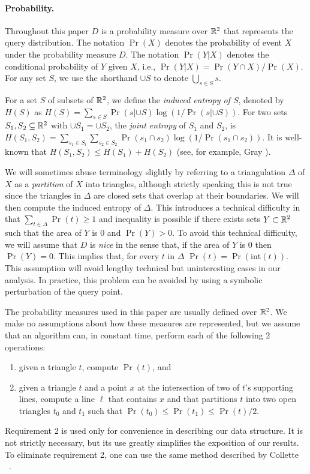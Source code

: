 \documentclass[lotsofwhite]{patmorin}
\newcommand{\interior}{\mathrm{int}}
\begin{document}
\paragraph{Probability.}

Throughout this paper $D$ is a probability measure over $\mathbb{R}^2$ that
represents the query distribution.  The notation $\Pr(X)$ denotes the
probability of event $X$ under the probability measure $D$.  The
notation $\Pr(Y|X)$ denotes the conditional probability of $Y$ given
$X$, i.e., $\Pr(Y|X)=\Pr(Y\cap X)/\Pr(X)$.  For any set $S$, we use
the shorthand $\cup S$ to denote $\bigcup_{s\in S} s$.

For a set $S$ of subsets of $\mathbb{R}^2$, we define the \emph{induced
entropy of $S$}, denoted by $H(S)$ as $H(S)=\sum_{s\in S}\Pr(s|{\cup
S})\log(1/\Pr(s|{\cup S}))$.  For two sets $S_1,S_2\subseteq\mathbb{R}^2$ with
$\cup S_1=\cup S_2$, the \emph{joint entropy} of $S_1$ and $S_2$, is
$H(S_1,S_2) = \sum_{s_1\in S_i}\sum_{s_2\in S_2} \Pr(s_1\cap
s_2)\log(1/\Pr(s_1\cap s_2))$.  It is well-known that $H(S_1,S_2)\le
H(S_1)+H(S_2)$ (see, for example, Gray \cite[Lemma~2.3.2]{g08}).

We will sometimes abuse terminology slightly by referring to a
triangulation $\Delta$ of $X$ as a \emph{partition} of $X$ into
triangles, although strictly speaking this is not true since the
triangles in $\Delta$ are closed sets that overlap at their
boundaries.  We will then compute the induced entropy of $\Delta$.
This introduces a technical difficulty in that
$\sum_{t\in\Delta}\Pr(t)\ge 1$ and inequality is possible if there
exists sets $Y\subset \mathbb{R}^2$ such that the area of $Y$ is 0 and
$\Pr(Y)>0$.  To avoid this technical difficulty, we will assume that
$D$ is \emph{nice} in the sense that, if the area of $Y$ is 0 then
$\Pr(Y)=0$.   This implies that, for every $t$ in $\Delta$ $\Pr(t) =
\Pr(\interior(t))$.  This assumption will avoid lengthy technical but
uninteresting cases in our analysis.  In practice, this problem can
be avoided by using a symbolic perturbation of the query point.

The probability measures used in this paper are usually defined over
$\mathbb{R}^2$.  We make no assumptions about how these measures are
represented, but we assume that an algorithm can, in constant time,
perform each of the following 2 operations:
\begin{enumerate}
\item given a triangle $t$, compute $\Pr(t)$, and
\item given a triangle $t$ and a point $x$ at the
intersection of two of $t$'s supporting lines, compute a line $\ell$
that contains $x$ and that partitions $t$ into two open triangles
$t_0$ and $t_1$ such that $\Pr(t_0)\le\Pr(t_1)\le\Pr(t)/2$.
\end{enumerate}
Requirement 2 is used only for convenience in describing our data
structure.  It is not strictly necessary, but its use greatly
simplifies the exposition of our results.  To eliminate requirement 2,
one can use the same method described by Collette \etal\
\cite[Section~5]{cdilm08}.
\end{document}
